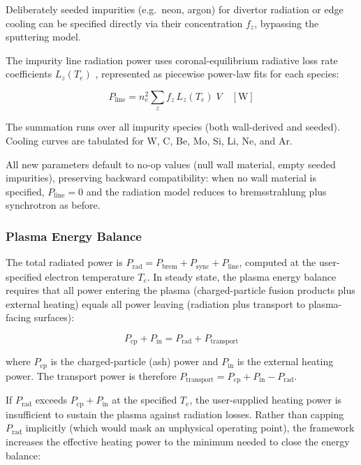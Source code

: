 \documentclass{article}
\begin{document}
Deliberately seeded impurities (e.g.\ neon, argon) for divertor
radiation or edge cooling can be specified directly via their
concentration $f_z$, bypassing the sputtering model.

The impurity line radiation power uses coronal-equilibrium radiative
loss rate coefficients $L_z(T_e)$
\citep{post1977, mavrin2018}, represented as piecewise
power-law fits for each species:

\begin{equation}
\label{eq:p-line}
P_{\text{line}} = n_e^2 \sum_z f_z \, L_z(T_e) \; V \quad [\text{W}]
\end{equation}

\noindent The summation runs over all impurity species (both
wall-derived and seeded). Cooling curves are tabulated for W, C, Be,
Mo, Si, Li, Ne, and Ar.

All new parameters default to no-op values (null wall material, empty
seeded impurities), preserving backward compatibility: when no wall
material is specified, $P_{\text{line}} = 0$ and the radiation model
reduces to bremsstrahlung plus synchrotron as before.

\subsubsection{Plasma Energy Balance}

The total radiated power is
$P_{\text{rad}} = P_{\text{brem}} + P_{\text{sync}} + P_{\text{line}}$,
computed at the user-specified electron temperature $T_e$.
In steady state, the plasma energy balance requires that all power
entering the plasma (charged-particle fusion products plus external
heating) equals all power leaving (radiation plus transport to
plasma-facing surfaces):

\begin{equation}
\label{eq:plasma-balance}
P_{\text{cp}} + P_{\text{in}} = P_{\text{rad}} + P_{\text{transport}}
\end{equation}

\noindent where $P_{\text{cp}}$ is the charged-particle (ash) power and
$P_{\text{in}}$ is the external heating power. The transport power is
therefore $P_{\text{transport}} = P_{\text{cp}} + P_{\text{in}} - P_{\text{rad}}$.

If $P_{\text{rad}}$ exceeds $P_{\text{cp}} + P_{\text{in}}$ at the
specified $T_e$, the user-supplied heating power is insufficient to
sustain the plasma against radiation losses. Rather than capping
$P_{\text{rad}}$ implicitly (which would mask an unphysical operating
point), the framework increases the effective heating power to the
minimum needed to close the energy balance:
\end{document}
